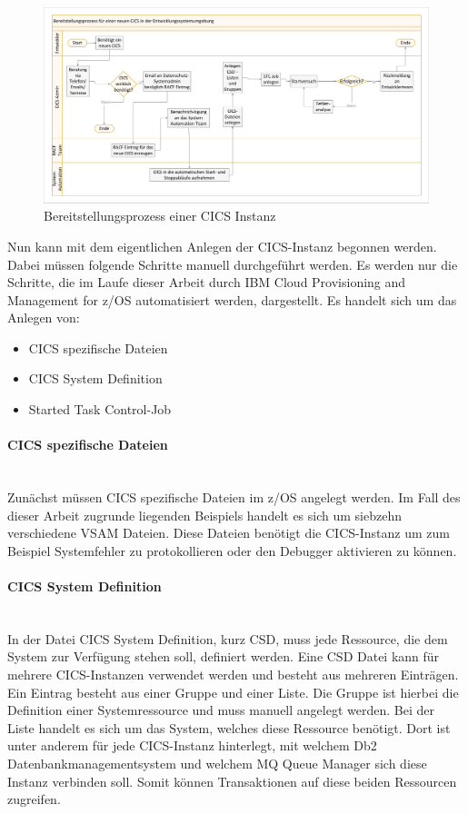 \begin{figure}[ht!]
\centering
\includegraphics[width=\paperwidth,angle=90]{figures/swimlaneCICS.pdf}
\caption{Bereitstellungsprozess einer CICS Instanz}
\label{fig:aktcics}
\end{figure}

Nun kann mit dem eigentlichen Anlegen der CICS-Instanz begonnen werden.
Dabei müssen folgende Schritte manuell durchgeführt werden.
Es werden nur die Schritte, die im Laufe dieser Arbeit durch \glqq IBM Cloud Provisioning and Management for z/OS\grqq{} automatisiert werden, dargestellt.
Es handelt sich um das Anlegen von:

\begin{itemize}
\item CICS spezifische Dateien
\item \glqq CICS System Definition\grqq
\item Started Task Control-Job
\end{itemize}

\paragraph{CICS spezifische Dateien}\label{sssec:speziDat} ~\\
Zunächst müssen CICS spezifische Dateien im z/OS angelegt werden.
Im Fall des dieser Arbeit zugrunde liegenden Beispiels handelt es sich um siebzehn verschiedene VSAM Dateien.
Diese Dateien benötigt die CICS-Instanz um zum Beispiel Systemfehler zu protokollieren oder den Debugger aktivieren zu können. 

\paragraph{\glqq CICS System Definition\grqq} ~\\
In der Datei \glqq CICS System Definition\grqq, kurz CSD, muss jede Ressource, die dem System zur Verfügung stehen soll, definiert werden.
Eine CSD Datei kann für mehrere CICS-Instanzen verwendet werden und besteht aus mehreren Einträgen.
Ein Eintrag besteht aus einer Gruppe und einer Liste.
Die Gruppe ist hierbei die Definition einer Systemressource und muss manuell angelegt werden.
Bei der Liste handelt es sich um das System, welches diese Ressource benötigt.
Dort ist unter anderem für jede CICS-Instanz hinterlegt, mit welchem Db2 Datenbankmanagementsystem und welchem MQ Queue Manager sich diese Instanz verbinden soll.
Somit können Transaktionen auf diese beiden Ressourcen zugreifen.

